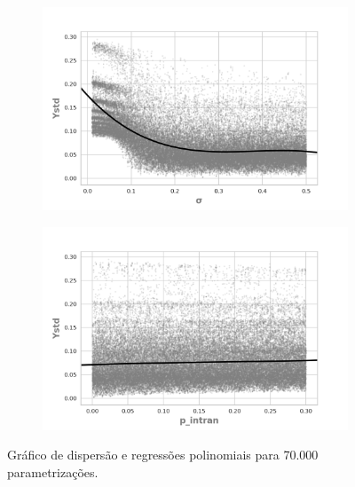 \begin{figure}[H]
                \begin{subfigure}[b]{0.49\textwidth}
            \includegraphics[width=\textwidth]{ims/nlregressions/nlregressionmutatingosigma.png}
          \end{subfigure}
                \begin{subfigure}[b]{0.49\textwidth}
            \includegraphics[width=\textwidth]{ims/nlregressions/nlregressionmutatingop_intran.png}
    \end{subfigure}
    \caption{Gráfico de dispersão e regressões polinomiais para 70.000 parametrizações.}
    \label{fig:scatter2}
  \end{figure}


